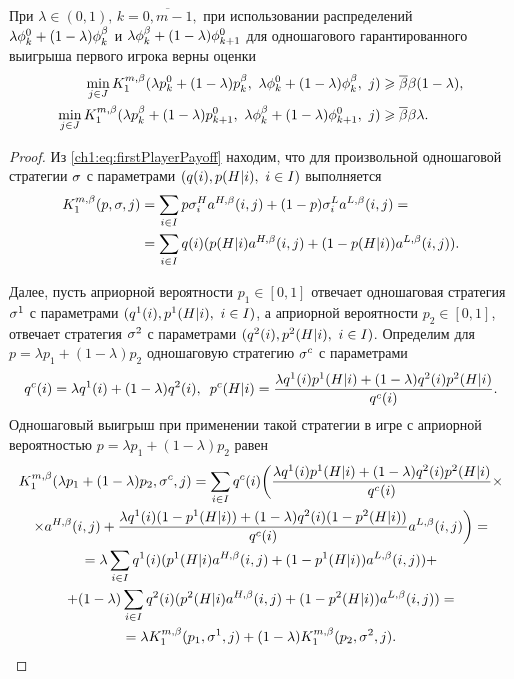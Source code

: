 {\begin{proposition}
  \label{ch1:prop:first:combination:step}
  При $\lambda \in (0, 1), \, k = \overline{0, m-1},$ при использовании распределений $\lambda\fEven + (1-\lambda)\fOdd$ и $\lambda\fOdd[k] + (1-\lambda)\fEven[k+1]$ для одношагового гарантированного выигрыша первого игрока верны оценки
  \begin{align*}
    \min_{j \in J}
    \K*{1}(%
    \lambda \pEven + (1-\lambda) \pOdd,\
    \lambda \fEven + (1-\lambda) \fOdd,\
    j)
    &\geq \DCo \Co (1-\lambda), \\
    \min_{j \in J}
    \K*{1}(%
    \lambda \pOdd + (1-\lambda) \pEven[k+1],\
    \lambda \fOdd + (1-\lambda) \fEven[k+1],\
    j)
    &\geq \DCo \Co \lambda.
  \end{align*}
\end{proposition}
\begin{proof}
  Из \eqref{ch1:eq:firstPlayerPayoff} находим, что для произвольной одношаговой стратегии $\sigmar$ с параметрами $(\qc{i}, \pac{H}{i},\ i \in I)$ выполняется
  \begin{align*}
    \K*{1}(p, \sigmar, j) 
    &= \sum_{i \in I} p \sigmas[H]{i} \as[H](i, j) + (1-p) \sigmas[L]{i} \as[L](i, j) = \\
    &= \sum_{i \in I} \qc{i} (\pac{H}{i} \as[H](i, j) + (1-\pac{H}{i}) \as[L](i, j)).
  \end{align*}
  
  Далее, пусть априорной вероятности $p_1 \in [0, 1]$ отвечает одношаговая стратегия $\sigmar^1$ с параметрами $(\qcn{1}{i}, \pacn{1}{H}{i},\ i \in I)$, а априорной вероятности $p_2 \in [0, 1]$, отвечает стратегия $\sigmar^2$ с параметрами $(\qcn{2}{i}, \pacn{2}{H}{i},\ i \in I)$.
  Определим для $p = \lambda p_1 + (1-\lambda) p_2$ одношаговую стратегию $\sigmar^c$ с параметрами
  \begin{equation*}
    \qcn{c}{i} = \lambda \qcn{1}{i} + (1-\lambda) \qcn{2}{i}, \enskip
    \pacn{c}{H}{i} = \frac{\lambda \qcn{1}{i} \pacn{1}{H}{i} + (1-\lambda) \qcn{2}{i} \pacn{2}{H}{i}}{\qcn{c}{i}}.
  \end{equation*}
  Одношаговый выигрыш при применении такой стратегии в игре с априорной вероятностью $p = \lambda p_1 + (1-\lambda) p_2$ равен
  \begin{multline*}
    \K*{1}(\lambda p_1 + (1-\lambda) p_2, \sigmar^c, j) = \sum_{i \in I} \qcn{c}{i} \biggl(
    \frac{\lambda \qcn{1}{i} \pacn{1}{H}{i}
      + (1-\lambda) \qcn{2}{i} \pacn{2}{H}{i}}{\qcn{c}{i}} \times \\
    \times \as[H](i, j)
    + \frac{\lambda \qcn{1}{i} (1-\pacn{1}{H}{i})
      + (1-\lambda) \qcn{2}{i} (1-\pacn{2}{H}{i})}{\qcn{c}{i}} \as[L](i, j)
     \biggr) = \\
    = \lambda \sum_{i \in I} \qcn{1}{i} (\pacn{1}{H}{i} \as[H](i, j) + (1-\pacn{1}{H}{i}) \as[L](i, j)) + \\
    + (1-\lambda) \sum_{i \in I} \qcn{2}{i} (\pacn{2}{H}{i} \as[H](i, j) + (1-\pacn{2}{H}{i}) \as[L](i, j)) = \\
    = \lambda \K*{1}(p_1, \sigmar^1, j) + (1-\lambda) \K*{1}(p_2, \sigmar^2, j).
  \end{multline*}
  

\end{proof}}
